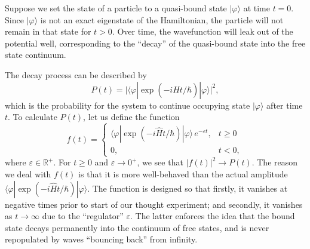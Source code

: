\documentclass[pra,12pt]{revtex4}
\begin{document}
Suppose we set the state of a particle to a quasi-bound state
$|\varphi\rangle$ at time $t = 0$.  Since $|\varphi\rangle$ is not an
exact eigenstate of the Hamiltonian, the particle will not remain in
that state for $t > 0$.  Over time, the wavefunction will leak out of
the potential well, corresponding to the ``decay'' of the quasi-bound
state into the free state continuum.

The decay process can be described by
\begin{equation}
  P(t) = \Big|\langle\varphi|\exp\left(-i\hat{H}t/\hbar\right)|\varphi\rangle\Big|^2,
\end{equation}
which is the probability for the system to continue occupying state
$|\varphi\rangle$ after time $t$.  To calculate $P(t)$, let us define
the function
\begin{equation}
  f(t) = \begin{cases} \langle\varphi|\exp\left(-i\hat{H}t/\hbar\right)|\varphi\rangle \,e^{-\varepsilon t}, & t \ge 0 \\ 0, & t < 0,\end{cases}
\end{equation}
where $\varepsilon \in \mathbb{R}^+$.  For $t \ge 0$ and $\varepsilon
\rightarrow 0^+$, we see that $|f(t)|^2 \rightarrow P(t)$.  The reason
we deal with $f(t)$ is that it is more well-behaved than the actual
amplitude $\langle\varphi|\exp(-i\hat{H}t/\hbar)|\varphi\rangle$.  The
function is designed so that firstly, it vanishes at negative times
prior to start of our thought experiment; and secondly, it vanishes as
$t\rightarrow\infty$ due to the ``regulator'' $\varepsilon$.  The
latter enforces the idea that the bound state decays permanently into
the continuum of free states, and is never repopulated by waves
``bouncing back'' from infinity.
\end{document}
